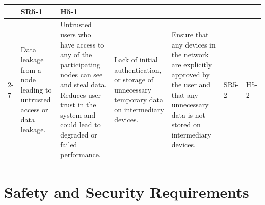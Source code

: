\documentclass{article}
\begin{document}
\begin{landscape}
\begin{longtable}{|p{}|p{}|p{}|p{}|p{}|p{}|p{}|}
  & SR5-1
  & H5-1 \\ \cline{2-7}
\multirow{-2}{\dimexpr0.2\textwidth\relax}{Privacy}
  & Data leakage from a node leading to untrusted access or data leakage.
  & Untrusted users who have access to any of the participating nodes can see and steal data. Reduces user trust in the system and could lead to degraded or failed performance.
  & Lack of initial authentication, or storage of unnecessary temporary data on intermediary devices.
  & Ensure that any devices in the network are explicitly approved by the user and that any unnecessary data is not stored on intermediary devices.
  & SR5-2
  & H5-2 \\ \hline
\end{longtable}
\end{landscape}
\restoregeometry

\section{Safety and Security Requirements}
\label{SecSafetyReqs}
\end{document}
